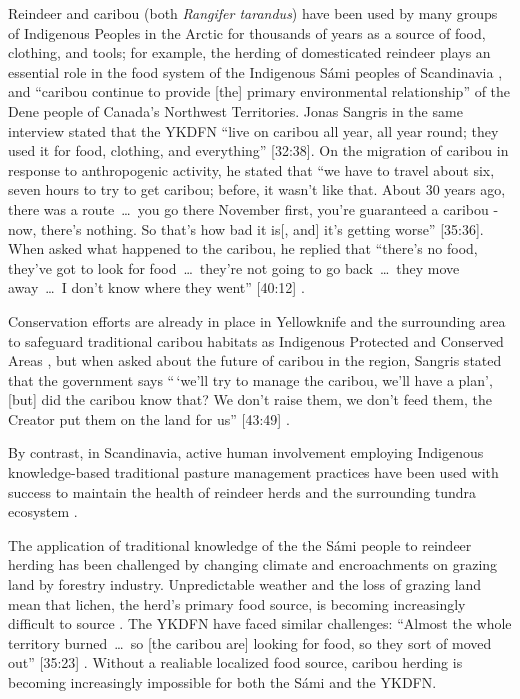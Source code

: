 \documentclass{report}
\begin{document}
\hspace{24pt} Reindeer and caribou (both \textit{Rangifer tarandus}) have been used by many groups of Indigenous Peoples in the Arctic for thousands of years as a source of food, clothing, and tools; for example, the herding of domesticated reindeer plays an essential role in the food system of the Indigenous S\'ami peoples of Scandinavia \parencite{traditionalsiberia}, and ``caribou continue to provide [the] primary environmental relationship'' \parencite[225]{denefoodwaysontologies} of the Dene people of Canada's Northwest Territories. 
Jonas Sangris in the same interview stated that the YKDFN ``live on caribou all year, all year round; they used it for food, clothing, and everything'' [32:38].
On the migration of caribou in response to anthropogenic activity, he stated that ``we have to travel about six, seven hours to try to get caribou; before, it wasn't like that. About 30 years ago, there was a route~\ldots~you go there November first, you're guaranteed a caribou - now, there's nothing. So that's how bad it is[, and] it's getting worse'' [35:36]. 
When asked what happened to the caribou, he replied that ``there's no food, they've got to look for food~\ldots~they're not going to go back~\ldots~they move away~\ldots~I don't know where they went'' [40:12] \parencite{jonassangris}.

\hspace{24pt} Conservation efforts are already in place in Yellowknife and the surrounding area to safeguard traditional caribou habitats as Indigenous Protected and Conserved Areas \parencite{resilientcommunities}, but when asked about the future of caribou in the region, Sangris stated that the government says ``\,`we'll try to manage the caribou, we'll have a plan', [but] did the caribou know that? We don't raise them, we don't feed them, the Creator put them on the land for us'' [43:49] \parencite{jonassangris}.

By contrast, in Scandinavia, active human involvement employing Indigenous knowledge-based traditional pasture management practices have been used with success to maintain the health of reindeer herds and the surrounding tundra ecosystem \parencite{reindeerfoodsovereignty}.

\hspace{24pt} The application of traditional knowledge of the the S\'ami people to reindeer herding has been challenged by changing climate and encroachments on grazing land by forestry industry. Unpredictable weather and the loss of grazing land mean that lichen, the herd's primary food source, is becoming increasingly difficult to source \parencite{samishiftingstrategies}.
The YKDFN have faced similar challenges: ``Almost the whole territory burned~\ldots~so [the caribou are] looking for food, so they sort of moved out'' [35:23] \parencite{jonassangris}. Without a realiable localized food source, caribou herding is becoming increasingly impossible for both the S\'ami and the YKDFN.
\end{document}

